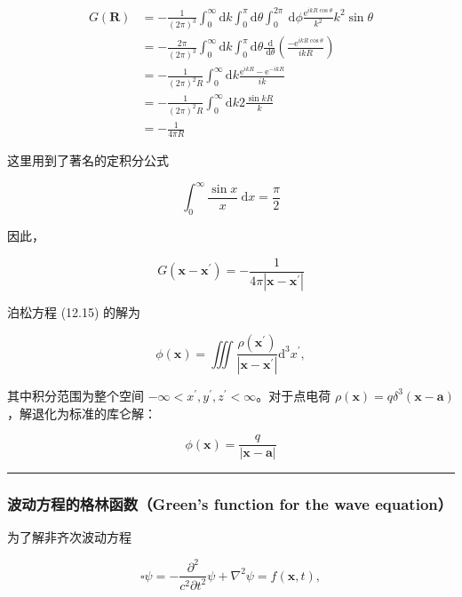 \[
\begin{aligned}
G(\mathbf{R}) & =-\frac{1}{(2 \pi)^{3}} \int_{0}^{\infty} \mathrm{d} k \int_{0}^{\pi} \mathrm{d} \theta \int_{0}^{2 \pi} \mathrm{~d} \phi \frac{\mathrm{e}^{i k R \cos \theta}}{k^{2}} k^{2} \sin \theta \\
& =-\frac{2 \pi}{(2 \pi)^{3}} \int_{0}^{\infty} \mathrm{d} k \int_{0}^{\pi} \mathrm{d} \theta \frac{\mathrm{~d}}{\mathrm{~d} \theta}\left(\frac{-\mathrm{e}^{i k R \cos \theta}}{i k R}\right) \\
& =-\frac{1}{(2 \pi)^{2} R} \int_{0}^{\infty} \mathrm{d} k \frac{\mathrm{e}^{i k R}-\mathrm{e}^{-i k R}}{i k} \\
& =-\frac{1}{(2 \pi)^{2} R} \int_{0}^{\infty} \mathrm{d} k 2 \frac{\sin k R}{k} \\
& =-\frac{1}{4 \pi R}
\end{aligned}
\]

这里用到了著名的定积分公式

\[
\int_{0}^{\infty} \frac{\sin x}{x} \mathrm{~d} x=\frac{\pi}{2}
\]

因此，

\[
G\left(\mathbf{x}-\mathbf{x}^{\prime}\right)=-\frac{1}{4 \pi\left|\mathbf{x}-\mathbf{x}^{\prime}\right|}
\]

泊松方程 (12.15) 的解为

\[
\phi(\mathbf{x})=\iiint \frac{\rho\left(\mathbf{x}^{\prime}\right)}{\left|\mathbf{x}-\mathbf{x}^{\prime}\right|} \mathrm{d}^{3} x^{\prime},
\]

其中积分范围为整个空间
\(-\infty<x^{\prime}, y^{\prime}, z^{\prime}<\infty\)。对于点电荷
\(\rho(\mathbf{x})=q \delta^{3}(\mathbf{x}-\mathbf{a})\)，解退化为标准的库仑解：

\[
\phi(\mathbf{x})=\frac{q}{|\mathbf{x}-\mathbf{a}|}
\]

\begin{center}\rule{0.5\linewidth}{0.5pt}\end{center}

\subsubsection{波动方程的格林函数（Green's function for the wave
equation）}\label{ux6ce2ux52a8ux65b9ux7a0bux7684ux683cux6797ux51fdux6570greens-function-for-the-wave-equation}

为了解非齐次波动方程

\[
\square \psi=-\frac{\partial^{2}}{c^{2} \partial t^{2}} \psi+\nabla^{2} \psi=f(\mathbf{x}, t),
\]

